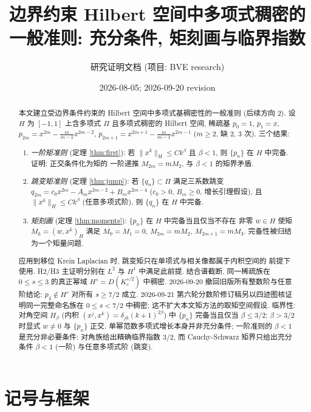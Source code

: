 \documentclass[UTF8]{ctexart}
\title{边界约束 Hilbert 空间中多项式稠密的一般准则: 充分条件, 矩刻画与临界指数}
\author{研究证明文档 (项目: BVE research)}
\date{2026-08-05; 2026-09-20 revision}
\begin{document}
\maketitle

\begin{abstract}
本文建立受边界条件约束的 Hilbert 空间中多项式基稠密性的一般准则 (后续方向 2).
设 $H$ 为 $[-1,1]$ 上含多项式 $\Pi$ 且多项式稠密的 Hilbert 空间, 稀疏基
$p_0 = 1$, $p_1 = x$, $p_{2m} = x^{2m} - \frac{m}{m-1}x^{2m-2}$,
$p_{2m+1} = x^{2m+1} - \frac{m}{m-1}x^{2m-1}$ ($m \geq 2$, 缺 2, 3 次). 三个结果:
\begin{enumerate}
	\item \emph{一阶矩准则} (定理 \ref{thm:first}): 若 $\|x^k\|_H \leq C k^\beta$ 且
		$\beta < 1$, 则 $\{p_n\}$ 在 $H$ 中完备. 证明: 正交条件化为矩的
		一阶递推 $M_{2m} = mM_2$, 与 $\beta < 1$ 的矩界矛盾.
	\item \emph{跳变矩准则} (定理 \ref{thm:jump}): 若 $\{q_n\} \subset \Pi$ 满足三系数跳变
		$q_{2m} = c_0 x^{2m} - A_m x^{2m-2} + B_m x^{2m-4}$ ($c_0 > 0$,
		$B_m \geq 0$, 增长引理假设), 且 $\|x^k\|_H \leq Ck^\beta$ (任意多项式阶),
		则 $\{q_n\}$ 在 $H$ 中完备.
	\item \emph{矩刻画} (定理 \ref{thm:moments}): $\{p_n\}$ 在 $H$ 中完备当且仅当不存在
		非零 $w \in H$ 使矩 $M_k = (w, x^k)_H$ 满足 $M_0 = M_1 = 0$,
		$M_{2m} = mM_2$, $M_{2m+1} = mM_3$. 完备性被归结为一个矩量问题.
\end{enumerate}
应用到移位 Krein Laplacian 时, 跳变矩只在单项式与相关像都属于内积空间的
前提下使用. H2/H3 主证明分别在 $L^2$ 与 $H^1$ 中满足此前提.
结合谱截断, 同一稀疏族在 $0\le s\le3$ 的真正幂域 $H^s=D(K_c^{s/2})$
中稠密. 2026-09-20 撤回旧版所有整数阶与任意阶结论:
$p_4\notin H^s$ 对所有 $s\ge7/2$ 成立. 2026-09-21 第六轮分数阶修订稿另以四迹图核证明同一完整命名族在 $0\le s<7/2$ 中稠密; 这不扩大本文矩方法的取矩空间假设.
临界性: 对角空间
$H_\beta$ (内积 $(x^j, x^k) = \delta_{jk}(k+1)^{2\beta}$) 中 $\{p_n\}$
完备当且仅当 $\beta \leq 3/2$; $\beta > 3/2$ 时显式 $w \neq 0$ 与
$\{p_n\}$ 正交. 单幂范数多项式增长本身并非充分条件; 一阶准则的 $\beta<1$ 是充分非必要条件:
对角族给出精确临界指数 $3/2$, 而 Cauchy-Schwarz 矩界只给出充分条件
$\beta < 1$ (一阶) 与任意多项式阶 (跳变).
\end{abstract}

\tableofcontents

\section{记号与框架}
\end{document}
